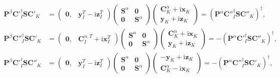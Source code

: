 \documentclass[a4paper,11pt,twoside,openright]{book}
\begin{document}
\begin{align}
  \mathbf{P}^{\beta}\mathbf{C}'^{\dagger}_{I}\mathbf{S}\mathbf{C}'_{K}
  &=\begin{pmatrix}
    \mathbf{0}, & \mathbf{y}^{T}_{I}-\text{i}\mathbf{z}^{T}_{I}
  \end{pmatrix}
  \begin{pmatrix}
    \mathbf{S}^{\alpha} & \mathbf{0}\\
    \mathbf{0} & \mathbf{S}^{\alpha}
  \end{pmatrix}
  \begin{pmatrix}
    \mathbf{C}^{\alpha}_{K}+\text{i}\mathbf{x}_{K}\\
    \mathbf{y}_{K}+\text{i}\mathbf{z}_{K}
  \end{pmatrix}%
  =\left(\mathbf{P}^{\alpha}\mathbf{C}''^{\dagger}_{I}\mathbf{S}\mathbf{C}''_{K}\right)^{\dagger},\\
%
  \mathbf{P}^{\beta}\mathbf{C}''^{\dagger}_{I}\mathbf{S}\mathbf{C}'_{K}
  &=\begin{pmatrix}
    \mathbf{0}, & \mathbf{C}^{\alpha,T}_{I}+\text{i}\mathbf{x}^{T}_{I}
  \end{pmatrix}
  \begin{pmatrix}
    \mathbf{S}^{\alpha} & \mathbf{0}\\
    \mathbf{0} & \mathbf{S}^{\alpha}
  \end{pmatrix}
  \begin{pmatrix}
    \mathbf{C}^{\alpha}_{K}+\text{i}\mathbf{x}_{K}\\
    \mathbf{y}_{K}+\text{i}\mathbf{z}_{K}
  \end{pmatrix}%
  =-\left(\mathbf{P}^{\alpha}\mathbf{C}'^{\dagger}_{I}\mathbf{S}\mathbf{C}''_{K}\right)^{\dagger},\\
%
  \mathbf{P}^{\beta}\mathbf{C}'^{\dagger}_{I}\mathbf{S}\mathbf{C}''_{K}
  &=\begin{pmatrix}
    \mathbf{0}, & \mathbf{y}^{T}_{I}-\text{i}\mathbf{z}^{T}_{I}
  \end{pmatrix}
  \begin{pmatrix}
    \mathbf{S}^{\alpha} & \mathbf{0}\\
    \mathbf{0} & \mathbf{S}^{\alpha}
  \end{pmatrix}
  \begin{pmatrix}
    -\mathbf{y}_{K}+\text{i}\mathbf{z}_{K}\\
    \mathbf{C}^{\alpha}_{K}-\text{i}\mathbf{x}_{K}
  \end{pmatrix}%
  =-\left(\mathbf{P}^{\alpha}\mathbf{C}''^{\dagger}_{I}\mathbf{S}\mathbf{C}'_{K}\right)^{\dagger},\\

\end{align}
\end{document}
